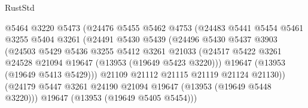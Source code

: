 \begin{lexlean}{RustStd}
\begin{coremodule}
                                    @5464
                                    @3220
                                    @5473
                                    (@24476
                                      @5455
                                      @5462
                                      @4753
                                      (@24483
                                        @5441
                                        @5454
                                        @5461
                                        @3255
                                        @5404
                                        @3261
                                        (@24491
                                          @5430
                                          @5439
                                          (@24496
                                            @5430
                                            @5437
                                            @3903
                                            (@24503
                                              @5429
                                              @5436
                                              @3255
                                              @5412
                                              @3261
                                              @21033
                                              (@24517
                                                @5422
                                                @3261
                                                @24528
                                                @21094
                                                @19647
                                                (@13953 (@19649 @5423 @3220)))
                                              @19647
                                              (@13953 (@19649 @5413 @5429)))
                                            @21109
                                            @21112
                                            @21115
                                            @21119
                                            @21124
                                            @21130))
                                        (@24179
                                          @5447
                                          @3261
                                          @24190
                                          @21094
                                          @19647
                                          (@13953 (@19649 @5448 @3220)))
                                        @19647
                                        (@13953 (@19649 @5405 @5454)))

\end{coremodule}
\end{lexlean}
